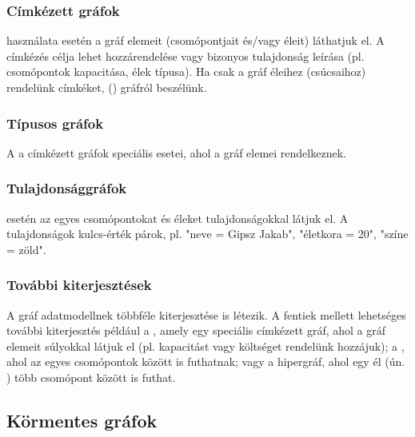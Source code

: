 \subsubsection{Címkézett gráfok}

 használata esetén a gráf elemeit (csomópontjait és/vagy éleit)  láthatjuk el. A címkézés célja lehet  hozzárendelése vagy bizonyos tulajdonság leírása (pl. csomópontok kapacitása, élek típusa).
Ha csak a gráf éleihez (csúcsaihoz) rendelünk címkéket,  () gráfról beszélünk.

\subsubsection{Típusos gráfok}

A  a címkézett gráfok speciális esetei, ahol a gráf elemei 
  rendelkeznek.
 
\subsubsection{Tulajdonsággráfok}

 esetén az egyes csomópontokat és éleket tulajdonságokkal látjuk el. A tulajdonságok kulcs-érték párok, pl. "neve = Gipsz Jakab", "életkora = 20", "színe = zöld".

\subsubsection{További kiterjesztések}

A gráf adatmodellnek többféle kiterjesztése is létezik. A fentiek mellett lehetséges további kiterjesztés például a , amely egy speciális címkézett gráf, ahol a gráf elemeit súlyokkal látjuk el (pl. kapacitást vagy költséget rendelünk hozzájuk); a , ahol az egyes csomópontok között  is futhatnak; vagy a hipergráf, ahol egy él (ún. ) több csomópont között is futhat.


\subsection{Körmentes gráfok}

